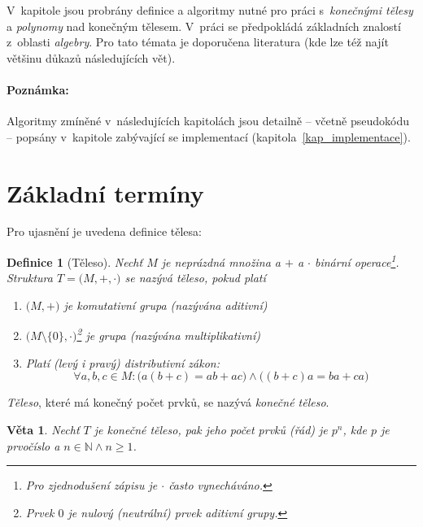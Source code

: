 \documentclass[thesis=M,czech,hidelinks]{FITthesis}[2012/06/26]
\newcommand{\0}{{\textcolor[gray]{0.80}{0}}}
\newtheorem{definice}{Definice}
\newtheorem{veta}{Věta}
\begin{document}
V~kapitole jsou probrány definice a algoritmy nutné pro práci s~\emph{konečnými
tělesy} a \emph{polynomy} nad konečným tělesem. V~práci se předpokládá
základních znalostí z~oblasti \emph{algebry}. Pro tato témata je doporučena
literatura \cite{FIT_MPI,FIT_MKY,FIT_LIN,FIT_BHW,Paar} (kde lze též najít
většinu důkazů následujících vět).

\paragraph{Poznámka:} Algoritmy zmíněné v~následujících kapitolách jsou detailně
-- včetně pseudokódu -- popsány v~kapitole zabývající se implementací
(kapitola~\ref{kap_implementace}).
\section{Základní termíny}

Pro ujasnění je uvedena definice tělesa:

\begin{definice}[Těleso]
    Nechť $M$ je neprázdná množina a $+$ a $\cdot$ binární operace\footnote{
        Pro zjednodušení zápisu je $\cdot$ často vynecháváno.
    }. Struktura
    $T=\big(M, +, \cdot \big)$ se nazývá těleso, pokud platí
    \begin{enumerate}
        \item $\big(M, +\big)$ je \emph{komutativní grupa} (nazývána
            \emph{aditivní})
        \item $\big(M\setminus\{\mathit{0}\}, \cdot \big)$\footnote{
                Prvek $\mathit{0}$ je \emph{nulový} (\emph{neutrální}) prvek
                \emph{aditivní grupy}.
            } je \emph{grupa} (nazývána
            \emph{multiplikativní})
        \item Platí (levý i pravý) \emph{distributivní zákon}:
            $$
                \forall a,b,c \in M :
                \big( a(b+c) = a b + a c \big) \land
                \big( (b+c)a = b a + c a \big)
            $$

    \end{enumerate}
\end{definice}
\emph{Těleso}, které má konečný počet prvků, se nazývá \emph{konečné těleso}.

\begin{veta}
    Nechť $T$ je \emph{konečné těleso}, pak jeho počet prvků (\emph{řád}) je
    $p^n$, kde $p$ je prvočíslo a $n \in \mathbb{N} \land n \geq 1 $.
\end{veta}
\end{document}
